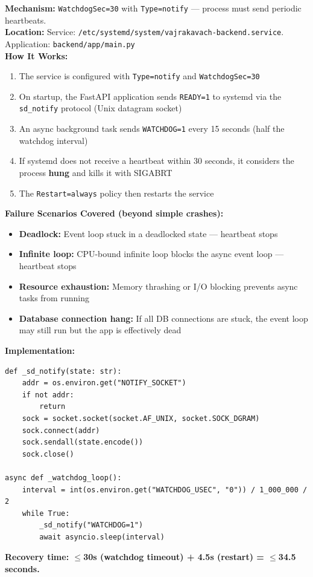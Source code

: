 \documentclass[11pt,a4paper]{article}
\begin{document}
\begin{tcolorbox}[colback=recoveryblue!5, colframe=recoveryblue]
\textbf{Mechanism:} \texttt{WatchdogSec=30} with \texttt{Type=notify} — process must send periodic heartbeats.\\
\textbf{Location:} Service: \texttt{/etc/systemd/system/vajrakavach-backend.service}. Application: \texttt{backend/app/main.py}\\
\textbf{How It Works:}
\begin{enumerate}[nosep]
  \item The service is configured with \texttt{Type=notify} and \texttt{WatchdogSec=30}
  \item On startup, the FastAPI application sends \texttt{READY=1} to systemd via the \texttt{sd\_notify} protocol (Unix datagram socket)
  \item An async background task sends \texttt{WATCHDOG=1} every 15 seconds (half the watchdog interval)
  \item If systemd does not receive a heartbeat within 30 seconds, it considers the process \textbf{hung} and kills it with SIGABRT
  \item The \texttt{Restart=always} policy then restarts the service
\end{enumerate}
\textbf{Failure Scenarios Covered (beyond simple crashes):}
\begin{itemize}[nosep]
  \item \textbf{Deadlock:} Event loop stuck in a deadlocked state — heartbeat stops
  \item \textbf{Infinite loop:} CPU-bound infinite loop blocks the async event loop — heartbeat stops
  \item \textbf{Resource exhaustion:} Memory thrashing or I/O blocking prevents async tasks from running
  \item \textbf{Database connection hang:} If all DB connections are stuck, the event loop may still run but the app is effectively dead
\end{itemize}
\textbf{Implementation:}
\begin{verbatim}
def _sd_notify(state: str):
    addr = os.environ.get("NOTIFY_SOCKET")
    if not addr:
        return
    sock = socket.socket(socket.AF_UNIX, socket.SOCK_DGRAM)
    sock.connect(addr)
    sock.sendall(state.encode())
    sock.close()

async def _watchdog_loop():
    interval = int(os.environ.get("WATCHDOG_USEC", "0")) / 1_000_000 / 2
    while True:
        _sd_notify("WATCHDOG=1")
        await asyncio.sleep(interval)
\end{verbatim}
\textbf{Recovery time: $\leq$30s (watchdog timeout) + 4.5s (restart) = $\leq$34.5 seconds.}
\end{tcolorbox}
\end{document}
